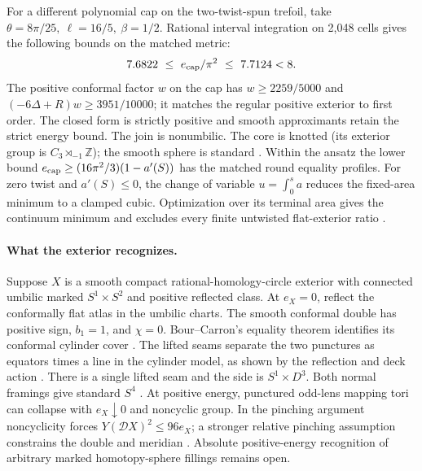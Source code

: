 \documentclass[11pt,letterpaper]{article}
\numberwithin{equation}{section}
\theoremstyle{definition}
\newcommand{\cD}{\mathcal D}
\begin{document}
For a different polynomial cap on the two-twist-spun trefoil, take
\(\theta=8\pi/25,\ \ell=16/5,\ \beta=1/2\). Rational interval integration
on 2,048 cells gives the following bounds on the matched metric:
\begin{equation}\label{eq:trefoil}
 7.6822\ \le\ e_{\rm cap}/\pi^2\ \le\ 7.7124<8.
\end{equation}
The positive conformal factor \(w\) on the cap has \(w\ge2259/5000\) and
\((-6\Delta+R)w\ge3951/10000\); it matches the regular positive exterior
to first order. The closed form is strictly positive and smooth
approximants retain the strict energy bound. The join is nonumbilic.
The core is knotted (its exterior group is
\(C_3\rtimes_{-1}\mathbb Z\)); the smooth sphere is standard
\cite{Zeeman1965Twisting,Gordon1976Knots,Baker2026MarkedCutCalculations}.
Within the ansatz the lower bound
\(e_{\rm cap}\ge(16\pi^2/3)(1-a'(S))\) has the matched round equality
profiles. For zero twist and \(a'(S)\le0\), the change of variable
\(u=\int_0^s a\) reduces the fixed-area minimum to a clamped cubic.
Optimization over its terminal area gives the continuum minimum and
excludes every finite untwisted flat-exterior ratio
\cite[TUBE, exact area minimum]{Baker2026MarkedCutCalculations}.

\paragraph{What the exterior recognizes.}
Suppose \(X\) is a smooth compact rational-homology-circle exterior
with connected umbilic marked \(S^1\times S^2\) and positive reflected
class. At \(e_X=0\), reflect the conformally flat atlas in the umbilic
charts. The smooth conformal double has positive sign, \(b_1=1\), and
\(\chi=0\). Bour--Carron's equality theorem identifies its conformal
cylinder cover \cite[Corollary 1.3(iii)]{BourCarron2015Optimal}.
The lifted seams separate the two punctures as equators times a line
in the cylinder model, as shown by the reflection and deck action
\cite[TUBE, zero-energy exterior]{Baker2026MarkedCutCalculations}.
There is a single lifted seam and the side is \(S^1\times D^3\).
Both normal framings give standard \(S^4\)
\cite[Proposition 2]{DingGeiges2010Diffeotopy}.
At positive energy, punctured odd-lens mapping tori can collapse with
\(e_X\downarrow0\) and noncyclic group. In the pinching argument
noncyclicity forces \(Y(\cD X)^2\le96e_X\);
a stronger relative pinching assumption constrains the double and
meridian \cite[Theorems 1.4 and 1.6]{ChenZhu2014Conformal}.
Absolute positive-energy recognition of arbitrary marked homotopy-sphere
fillings remains open.
\end{document}
